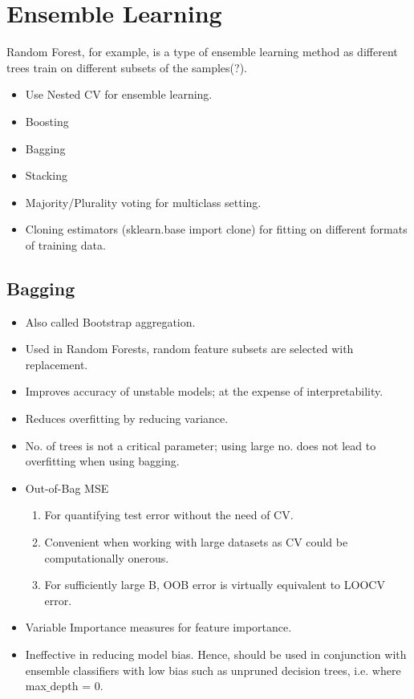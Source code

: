 \documentclass[a4paper, 12pt]{report}
\begin{document}

\section{Ensemble Learning}
Random Forest, for example, is a type of ensemble learning method as different trees train on {\color{red}different subsets of the samples(?)}.

\begin{itemize}
\item Use Nested CV for ensemble learning.
\item Boosting
\item Bagging
\item Stacking
\item Majority/Plurality voting for multiclass setting.
\item Cloning estimators ({\color{cyan}sklearn.base import clone}) for fitting on different formats of training data.
\end{itemize}

\subsection{Bagging}
\label{subsec:bagging}
\begin{itemize}
\item Also called Bootstrap aggregation.
\item Used in Random Forests, random feature subsets are selected with replacement.
\item Improves accuracy of unstable models; at the expense of interpretability.
\item Reduces overfitting by reducing variance.
\item No. of trees is not a critical parameter; using large no. does not lead to overfitting when using bagging.
\item Out-of-Bag MSE 
\begin{enumerate}
\item For quantifying test error without the need of CV.
\item Convenient when working with large datasets as CV could be computationally onerous.
\item For sufficiently large B, OOB error is virtually equivalent to LOOCV error.
\end{enumerate} 
\item Variable Importance measures for feature importance.
\item Ineffective in reducing model bias. Hence, should be used in conjunction with ensemble classifiers with low bias such as unpruned decision trees, i.e. where max$\_$depth = 0.
\end{itemize}
\end{document}
